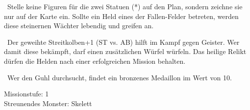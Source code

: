 {{		\trap~Stelle keine Figuren für die zwei Statuen (*) auf den Plan, sondern zeichne sie nur auf der Karte ein. Sollte ein Held eines der Fallen-Felder betreten, werden diese steinernen Wächter lebendig und greifen an. %

		\search~Der geweihte Streitkolben+1 (ST vs. AB) hilft im Kampf gegen Geister. Wer damit diese bekämpft, darf einen zusätzlichen Würfel würfeln. Das heilige Relikt dürfen die Helden nach einer erfolgreichen Mission behalten.

		\bigskip

		 

		\bigskip

		 

		\search~Wer den Guhl durchsucht, findet ein bronzenes Medaillon im Wert von 10\gold.

		\bigskip

		\noindent
		Missionstufe: 1 \\
		Streunendes Monster: Skelett
	}
}

